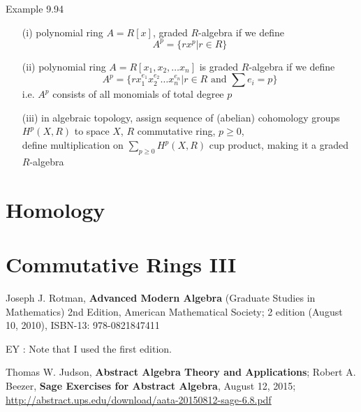 \documentclass[twoside,landscape]{amsart}
\theoremstyle{plain}
\theoremstyle{definition}
\theoremstyle{remark}
\begin{document}
\begin{multicols*}{2}
Example 9.94 
\begin{enumerate}
\item[(i)] polynomial ring $A = R[x]$, graded $R$-algebra if we define 
\[
A^p = \lbrace rx^p | r\in R \rbrace
\]
\item[(ii)] polynomial ring $A = R[x_1, x_2, \dots x_n ]$ is graded $R$-algebra if we define
\[
A^p = \lbrace rx_1^{e_1}x_2^{e_2} \dots x_n^{e_n} | r \in R \text{ and } \sum e_i = p \rbrace
\]
i.e. $A^p$ consists of all monomials of total degree $p$
\item[(iii)] in algebraic topology, assign sequence of (abelian) cohomology groups $H^p(X,R)$ to space $X$, $R$ commutative ring, $p\geq 0$, \\
define multiplication on $\sum_{ p \geq 0} H^p(X,R)$ cup product, making it a graded $R$-algebra
\end{enumerate}

\section{ Homology }



\section{ Commutative Rings III}



\end{multicols*}


\begin{thebibliography}{9}
Joseph J. Rotman, \textbf{Advanced Modern Algebra} (Graduate Studies in Mathematics) 2nd Edition, American Mathematical Society; 2 edition (August 10, 2010), ISBN-13: 978-0821847411

EY : Note that I used the first edition.  

Thomas W. Judson, \textbf{Abstract Algebra Theory and Applications}; Robert A. Beezer, \textbf{Sage Exercises for Abstract Algebra}, August 12, 2015; \url{http://abstract.ups.edu/download/aata-20150812-sage-6.8.pdf}
\end{thebibliography}
\end{document}

